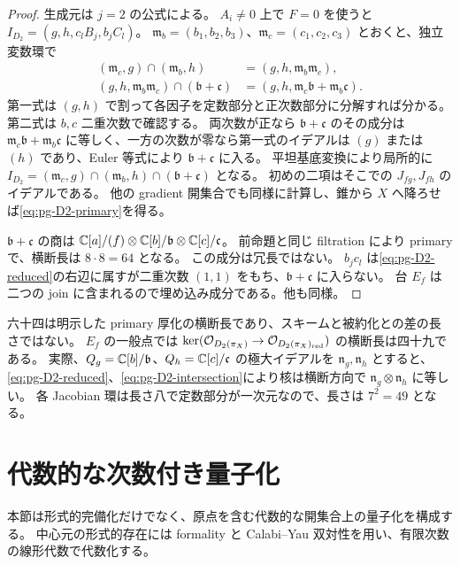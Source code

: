 \begin{proof}
生成元は $j=2$ の公式による。
$A_i\neq0$ 上で $F=0$ を使うと
$I_{D_2}=(g,h,c_lB_j,b_jC_l)$。
$\mathfrak m_b=(b_1,b_2,b_3)$、$\mathfrak m_c=(c_1,c_2,c_3)$ とおくと、独立変数環で
\begin{align}
(\mathfrak m_c,g)\cap(\mathfrak m_b,h)&=(g,h,\mathfrak m_b\mathfrak m_c),\label{eq:pg-D2-reduced}\\
(g,h,\mathfrak m_b\mathfrak m_c)\cap(\mathfrak b+\mathfrak c)
&=(g,h,\mathfrak m_c\mathfrak b+\mathfrak m_b\mathfrak c).\label{eq:pg-D2-intersection}
\end{align}
第一式は $(g,h)$ で割って各因子を定数部分と正次数部分に分解すれば分かる。
第二式は $b,c$ 二重次数で確認する。
両次数が正なら $\mathfrak b+\mathfrak c$ のその成分は
$\mathfrak m_c\mathfrak b+\mathfrak m_b\mathfrak c$ に等しく、一方の次数が零なら第一式のイデアルは $(g)$ または $(h)$ であり、Euler 等式により $\mathfrak b+\mathfrak c$ に入る。
平坦基底変換により局所的に
$I_{D_2}=(\mathfrak m_c,g)\cap(\mathfrak m_b,h)\cap(\mathfrak b+\mathfrak c)$ となる。
初めの二項はそこでの $J_{fg},J_{fh}$ のイデアルである。
他の gradient 開集合でも同様に計算し、錐から $X$ へ降ろせば\eqref{eq:pg-D2-primary}を得る。

$\mathfrak b+\mathfrak c$ の商は
$\mathbb C[a]/(f)\otimes\mathbb C[b]/\mathfrak b\otimes\mathbb C[c]/\mathfrak c$。
前命題と同じ filtration により primary で、横断長は $8\cdot8=64$ となる。
この成分は冗長ではない。
$b_jc_l$ は\eqref{eq:pg-D2-reduced}の右辺に属すが二重次数 $(1,1)$ をもち、$\mathfrak b+\mathfrak c$ に入らない。
台 $E_f$ は二つの join に含まれるので埋め込み成分である。他も同様。
\end{proof}
\begin{remark}\label{rem:pg-length49}
六十四は明示した primary 厚化の横断長であり、スキームと被約化との差の長さではない。
$E_f$ の一般点では
$\ker(\mathcal O_{D_2(\pi_X)}\to\mathcal O_{D_2(\pi_X)_{\mathrm{red}}})$ の横断長は四十九である。
実際、$Q_g=\mathbb C[b]/\mathfrak b$、$Q_h=\mathbb C[c]/\mathfrak c$ の極大イデアルを
$\mathfrak n_g,\mathfrak n_h$ とすると、\eqref{eq:pg-D2-reduced}、\eqref{eq:pg-D2-intersection}により核は横断方向で $\mathfrak n_g\otimes\mathfrak n_h$ に等しい。
各 Jacobian 環は長さ八で定数部分が一次元なので、長さは $7^2=49$ となる。
\end{remark}

\section{代数的な次数付き量子化}\label{sec:pg-quantization}
本節は形式的完備化だけでなく、原点を含む代数的な開集合上の量子化を構成する。
中心元の形式的存在には formality と Calabi--Yau 双対性を用い、有限次数の線形代数で代数化する。

